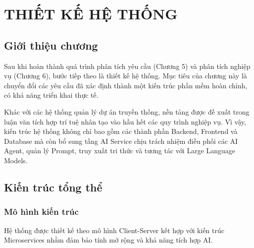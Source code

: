 \documentclass[12pt,a4paper]{report}
\begin{document}
\chapter{THIẾT KẾ HỆ THỐNG}
\label{chap:system_design}

\section{Giới thiệu chương}

Sau khi hoàn thành quá trình phân tích yêu cầu (Chương 5) và phân tích nghiệp vụ (Chương 6), bước tiếp theo là thiết kế hệ thống. Mục tiêu của chương này là chuyển đổi các yêu cầu đã xác định thành một kiến trúc phần mềm hoàn chỉnh, có khả năng triển khai thực tế.

Khác với các hệ thống quản lý dự án truyền thống, nền tảng được đề xuất trong luận văn tích hợp trí tuệ nhân tạo vào hầu hết các quy trình nghiệp vụ. Vì vậy, kiến trúc hệ thống không chỉ bao gồm các thành phần Backend, Frontend và Database mà còn bổ sung tầng AI Service chịu trách nhiệm điều phối các AI Agent, quản lý Prompt, truy xuất tri thức và tương tác với Large Language Models.
\section{Kiến trúc tổng thể}

\subsection{Mô hình kiến trúc}

Hệ thống được thiết kế theo mô hình Client-Server kết hợp với kiến trúc Microservices nhằm đảm bảo tính mở rộng và khả năng tích hợp AI.
\end{document}
